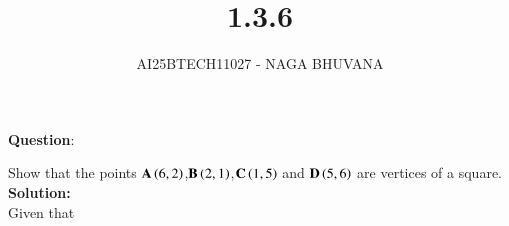 \documentclass[journal,12pt,onecolumn]{IEEEtran}
\begin{document}
\title{1.3.6}
\author{AI25BTECH11027 - NAGA BHUVANA}
{\let\newpage\relax\maketitle}

		\textbf{Question}:

		\noindent Show that the points $\mathbf{A}\left(6,2\right)$,$\mathbf{B}\left(2,1\right)$,$\mathbf{C}\left(1,5\right)$ and $\mathbf{D}\left(5,6\right)$ are vertices of a square.\\
		\textbf{Solution:}\\
      Given that
\end{document}
